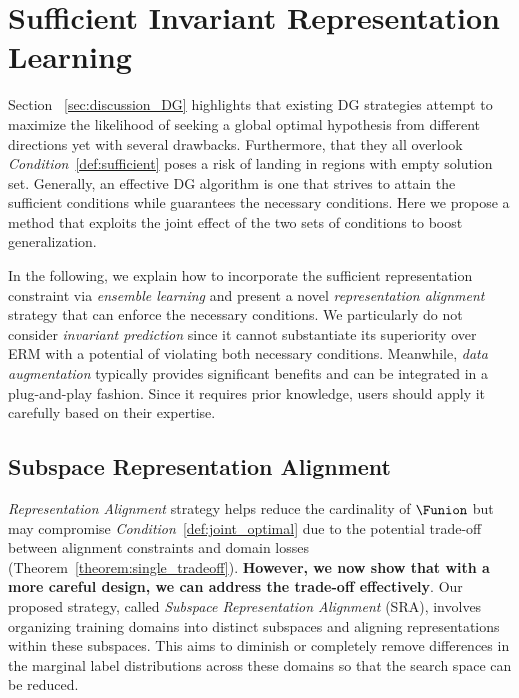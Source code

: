 

\section{Sufficient Invariant Representation Learning}
\label{sec:main_proposed_method}

Section ~\ref{sec:discussion_DG} highlights that existing DG strategies attempt to maximize the likelihood of seeking a global optimal hypothesis from different directions yet with several drawbacks. Furthermore, that they all overlook \textit{Condition}~\ref{def:sufficient} poses a risk of landing in regions with empty solution set. Generally, an effective DG algorithm is one that strives to attain the sufficient conditions while guarantees the necessary conditions. Here we propose a method that exploits the joint effect of the two sets of conditions to boost generalization. 

In the following, we explain how to incorporate the sufficient representation constraint via \textit{ensemble learning} and present a novel \textit{representation alignment} strategy that can enforce the necessary conditions. We particularly do not consider \textit{invariant prediction} since it cannot substantiate its superiority over ERM with a potential of violating both necessary conditions. Meanwhile, \textit{data augmentation} typically provides significant benefits and can be integrated in a plug-and-play fashion. Since it requires prior knowledge, users should apply it carefully based on their expertise. 






\subsection{Subspace Representation Alignment}

\textit{Representation Alignment} strategy helps reduce the cardinality of $\Funion$ but may compromise \textit{Condition}~\ref{def:joint_optimal} due to the potential trade-off between alignment constraints and domain losses (Theorem~\ref{theorem:single_tradeoff}). \textbf{However, we now show that with a more careful design, we can address the trade-off effectively}. Our proposed strategy, called \textit{Subspace Representation Alignment} (SRA), involves organizing training domains into distinct subspaces and aligning representations within these subspaces. 
This aims to diminish or completely remove differences in the marginal label distributions across these domains so that the search space can be reduced. 

